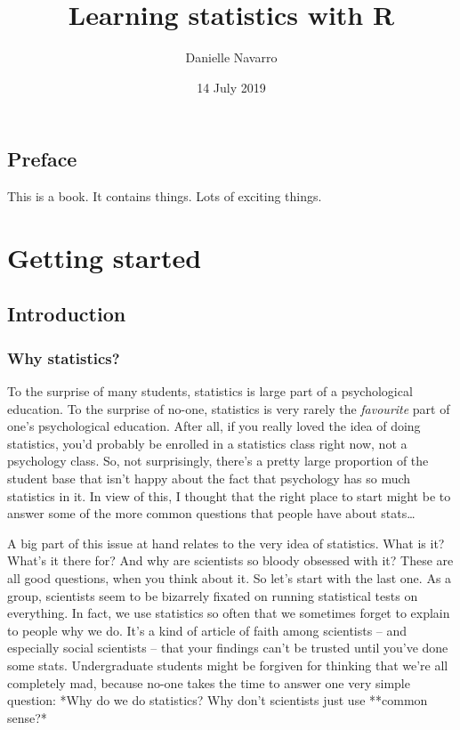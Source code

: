 \documentclass[]{book}
\title{Learning statistics with R}
\author{Danielle Navarro}
\date{14 July 2019}
\begin{document}
\maketitle

{
\setcounter{tocdepth}{1}
\tableofcontents
}
\hypertarget{preface}{%
\chapter*{Preface}\label{preface}}

This is a book. It contains things. Lots of exciting things.

\hypertarget{part-getting-started}{%
\part{Getting started}\label{part-getting-started}}

\hypertarget{intro}{%
\chapter{Introduction}\label{intro}}

\hypertarget{whywhywhy}{%
\section{Why statistics?}\label{whywhywhy}}

To the surprise of many students, statistics is large part of a psychological education. To the surprise of no-one, statistics is very rarely the \emph{favourite} part of one's psychological education. After all, if you really loved the idea of doing statistics, you'd probably be enrolled in a statistics class right now, not a psychology class. So, not surprisingly, there's a pretty large proportion of the student base that isn't happy about the fact that psychology has so much statistics in it. In view of this, I thought that the right place to start might be to answer some of the more common questions that people have about stats\ldots{}

A big part of this issue at hand relates to the very idea of statistics. What is it? What's it there for? And why are scientists so bloody obsessed with it? These are all good questions, when you think about it. So let's start with the last one. As a group, scientists seem to be bizarrely fixated on running statistical tests on everything. In fact, we use statistics so often that we sometimes forget to explain to people why we do. It's a kind of article of faith among scientists -- and especially social scientists -- that your findings can't be trusted until you've done some stats. Undergraduate students might be forgiven for thinking that we're all completely mad, because no-one takes the time to answer one very simple question: *Why do we do statistics? Why don't scientists just use **common sense?*
\end{document}
